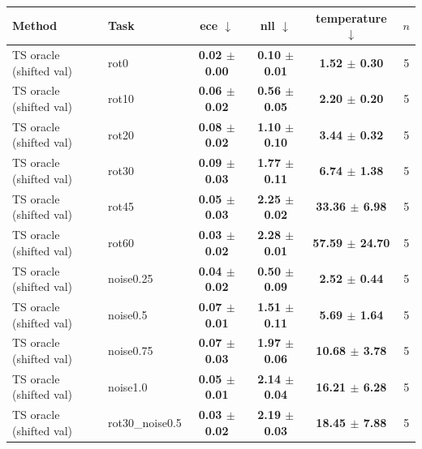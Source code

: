 \begin{tabular}{llcccc}
\toprule
Method & Task & ece $\downarrow$ & nll $\downarrow$ & temperature $\downarrow$ & $n$ \\
\midrule
TS oracle (shifted val) & rot0 & \textbf{0.02 $\pm$ 0.00} & \textbf{0.10 $\pm$ 0.01} & \textbf{1.52 $\pm$ 0.30} & 5 \\
\midrule
TS oracle (shifted val) & rot10 & \textbf{0.06 $\pm$ 0.02} & \textbf{0.56 $\pm$ 0.05} & \textbf{2.20 $\pm$ 0.20} & 5 \\
\midrule
TS oracle (shifted val) & rot20 & \textbf{0.08 $\pm$ 0.02} & \textbf{1.10 $\pm$ 0.10} & \textbf{3.44 $\pm$ 0.32} & 5 \\
\midrule
TS oracle (shifted val) & rot30 & \textbf{0.09 $\pm$ 0.03} & \textbf{1.77 $\pm$ 0.11} & \textbf{6.74 $\pm$ 1.38} & 5 \\
\midrule
TS oracle (shifted val) & rot45 & \textbf{0.05 $\pm$ 0.03} & \textbf{2.25 $\pm$ 0.02} & \textbf{33.36 $\pm$ 6.98} & 5 \\
\midrule
TS oracle (shifted val) & rot60 & \textbf{0.03 $\pm$ 0.02} & \textbf{2.28 $\pm$ 0.01} & \textbf{57.59 $\pm$ 24.70} & 5 \\
\midrule
TS oracle (shifted val) & noise0.25 & \textbf{0.04 $\pm$ 0.02} & \textbf{0.50 $\pm$ 0.09} & \textbf{2.52 $\pm$ 0.44} & 5 \\
\midrule
TS oracle (shifted val) & noise0.5 & \textbf{0.07 $\pm$ 0.01} & \textbf{1.51 $\pm$ 0.11} & \textbf{5.69 $\pm$ 1.64} & 5 \\
\midrule
TS oracle (shifted val) & noise0.75 & \textbf{0.07 $\pm$ 0.03} & \textbf{1.97 $\pm$ 0.06} & \textbf{10.68 $\pm$ 3.78} & 5 \\
\midrule
TS oracle (shifted val) & noise1.0 & \textbf{0.05 $\pm$ 0.01} & \textbf{2.14 $\pm$ 0.04} & \textbf{16.21 $\pm$ 6.28} & 5 \\
\midrule
TS oracle (shifted val) & rot30\_noise0.5 & \textbf{0.03 $\pm$ 0.02} & \textbf{2.19 $\pm$ 0.03} & \textbf{18.45 $\pm$ 7.88} & 5 \\
\bottomrule
\end{tabular}
